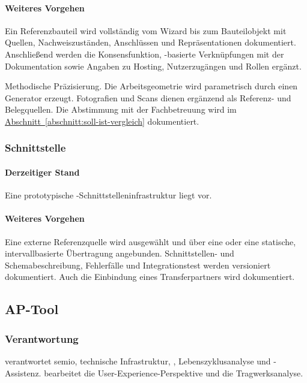 \documentclass[type=zwischenbericht]{zukunftbau}
\begin{document}
\paragraph{Weiteres Vorgehen}
Ein Referenzbauteil wird vollständig vom Wizard bis zum Bauteilobjekt mit Quellen, Nachweiszuständen, Anschlüssen und Repräsentationen dokumentiert. Anschließend werden die Konsensfunktion, -basierte Verknüpfungen mit der Dokumentation sowie Angaben zu \Gls{Hosting}, Nutzerzugängen und Rollen ergänzt.

Methodische Präzisierung. Die Arbeitsgeometrie wird parametrisch durch einen Generator erzeugt. Fotografien und Scans dienen ergänzend als Referenz- und Belegquellen. Die Abstimmung mit der Fachbetreuung wird im \hyperref[abschnitt:soll-ist-vergleich]{Abschnitt~\ref*{abschnitt:soll-ist-vergleich}} dokumentiert.

\subsubsection{Schnittstelle}

\paragraph{Derzeitiger Stand}
Eine prototypische -Schnittstelleninfrastruktur liegt vor.

\paragraph{Weiteres Vorgehen}
Eine externe Referenzquelle wird ausgewählt und über eine  oder eine statische, intervallbasierte Übertragung angebunden. Schnittstellen- und Schemabeschreibung, Fehlerfälle und Integrationstest werden versioniert dokumentiert. Auch die Einbindung eines Transferpartners wird dokumentiert.

\subsection{AP-Tool}

\subsubsection{Verantwortung}
 verantwortet semio, technische Infrastruktur, , Lebenszyklusanalyse und -Assistenz.  bearbeitet die User-Experience-Perspektive und die Tragwerksanalyse.
\end{document}
